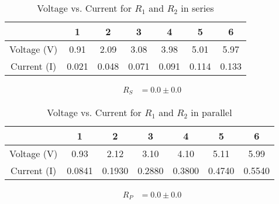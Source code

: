 \documentclass[a4paper]{article}
\begin{document}
\begin{table}[h!]
  \begin{center}
    \caption{Voltage vs. Current for \(R_1\) and \(R_2\) in series}\label{tab:table1}
    \begin{tabular}{|c|c|c|c|c|c|c|}\hline
      & 1 & 2 & 3 & 4 & 5 & 6 \\ \hline
      Voltage (V) & 0.91 & 2.09 & 3.08 & 3.98 & 5.01 & 5.97 \\ \hline
      Current (I) & 0.021 & 0.048 & 0.071 & 0.091 & 0.114 & 0.133 \\ \hline
    \end{tabular}
  \end{center}
  \begin{center}
    \begin{equation}
      \begin{split}
        R_S &= \boxed{0.0 \pm 0.0}
      \end{split}
    \end{equation}
  \end{center}
\end{table}

\begin{table}[h!]
  \begin{center}
    \caption{Voltage vs. Current for \(R_1\) and \(R_2\) in parallel}\label{tab:table1}
    \begin{tabular}{|c|c|c|c|c|c|c|}\hline
      & 1 & 2 & 3 & 4 & 5 & 6 \\ \hline
      Voltage (V) & 0.93 & 2.12 & 3.10 & 4.10 & 5.11 & 5.99 \\ \hline
      Current (I) & 0.0841 & 0.1930 & 0.2880 & 0.3800 & 0.4740 & 0.5540 \\ \hline
    \end{tabular}
  \end{center}
  \begin{center}
    \begin{equation}
      \begin{split}
        R_P &= \boxed{0.0 \pm 0.0}
      \end{split}
    \end{equation}
  \end{center}
\end{table}
\end{document}
